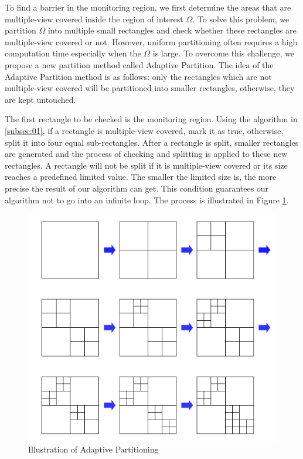 To find a barrier in the monitoring region, we first determine the areas that are multiple-view covered inside the region of interest $\Omega$. To solve this problem, we partition $\Omega$ into multiple small rectangles and check whether these rectangles are multiple-view covered or not. However, uniform partitioning often requires a high computation time especially when the $\Omega$ is large. To overcome this challenge, we propose a new partition method called Adaptive Partition. The idea of the Adaptive Partition method is as follows: only the rectangles which are not multiple-view covered will be partitioned into smaller rectangles, otherwise, they are kept untouched. \par
The first rectangle to be checked is the monitoring region. 
Using the algorithm in \ref{subsec:01}, if a rectangle is multiple-view covered, mark it as true, otherwise, split it into four equal sub-rectangles. After a rectangle is split, smaller rectangles are generated and the process of checking and splitting is applied to these new rectangles. A rectangle will not be split if it is multiple-view covered or its size reaches a predefined limited value. The smaller the limited size is, the more precise the result of our algorithm can get. This condition guarantees our algorithm not to go into an infinite loop. The process is illustrated in Figure \ref{dynamic}.
%
\begin{figure}[!h]
	\begin{center}
		\includegraphics[scale=1.]{Dynamic_Partition.pdf}
	\end{center}
	\caption{Illustration of Adaptive Partitioning}
	\label{dynamic}
\end{figure}

